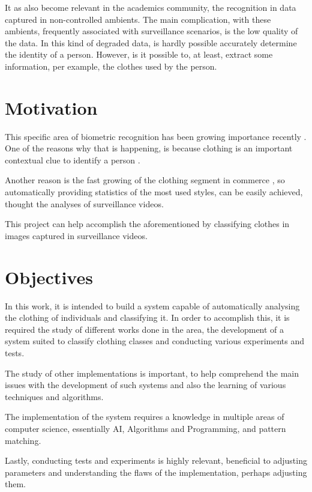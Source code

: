 \documentclass[titlepage,12pt,a4paper,times]{book}
\begin{document}
It as also become relevant in the academics community, the recognition in data
captured in non-controlled ambients. The main complication, with these
ambients, frequently associated with surveillance scenarios, is the low quality
of the data. In this kind of degraded data, is hardly possible accurately
determine the identity of a person. However, is it possible to, at least,
extract some information, per example, the clothes used by the person.

\section{Motivation}
\label{sec:mot}

This specific area of biometric recognition has been growing importance
recently \citep{1, 4}. One of the reasons why that is happening, is because
clothing is an important contextual clue to identify a person \citep{2, 13}.

Another reason is the fast growing of the clothing segment in commerce
\citep{5}, so automatically providing statistics of the most used styles, can
be easily achieved, thought the analyses of surveillance videos.

This project can help accomplish the aforementioned by classifying clothes in
images captured in surveillance videos.

\section{Objectives}
\label{sec:obj}

In this work, it is intended to build a system capable of automatically
analysing the clothing of individuals and classifying it. In order to
accomplish this, it is required the study of different works done in the area,
the development of a system suited to classify clothing classes and conducting
various experiments and tests.

The study of other implementations is important, to help comprehend the main
issues with the development of such systems and also the learning of various
techniques and algorithms.

The implementation of the system requires a knowledge in multiple areas of
computer science, essentially \ac{AI}, Algorithms and Programming, and pattern
matching.

Lastly, conducting tests and experiments is highly relevant, beneficial to
adjusting parameters and understanding the flaws of the implementation, perhaps
adjusting them.
\end{document}
